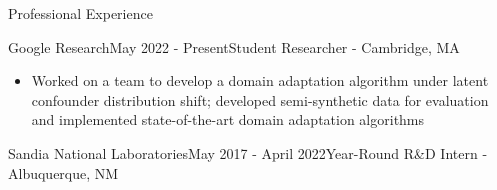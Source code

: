 \documentclass[11pt]{resume} %
\begin{document}
\begin{rSection}{Professional Experience}
\begin{rSubsection}{Google Research}{May 2022 - Present}{Student Researcher - Cambridge, MA}

\begin{itemize}[label={}]
    \setlength\itemsep{0em}
    \item Worked on a team to develop a domain adaptation algorithm under latent confounder distribution shift;
    developed semi-synthetic data for evaluation and implemented state-of-the-art domain adaptation algorithms
\end{itemize}

\end{rSubsection}

\begin{rSubsection}{Sandia National Laboratories}{May 2017 - April 2022}{Year-Round R\&D Intern - Albuquerque, NM}


\end{rSubsection}
\end{rSection}
\end{document}
